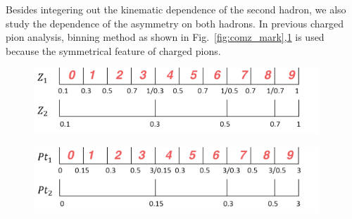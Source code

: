 Besides integering out the kinematic dependence of the second hadron, we also study the dependence of the asymmetry on both hadrons. In previous charged pion analysis, binning method as shown in Fig.~\ref{fig:comz_mark},\ref{fig:compt_mark} is used because the symmetrical feature of charged pions. 
\begin{figure}[H]
\centering
\begin{minipage}{.5\textwidth}
  \centering
  \includegraphics[width=0.95\textwidth,natwidth=610,natheight=642]{figure_dataselection/zbin.pdf}
  \label{fig:comz_mark}
\end{minipage}%
\begin{minipage}{.5\textwidth}
  \centering
  \includegraphics[width=0.95\textwidth,natwidth=610,natheight=642]{figure_dataselection/ptbin.pdf}
  \label{fig:compt_mark}
\end{minipage}
\end{figure}

